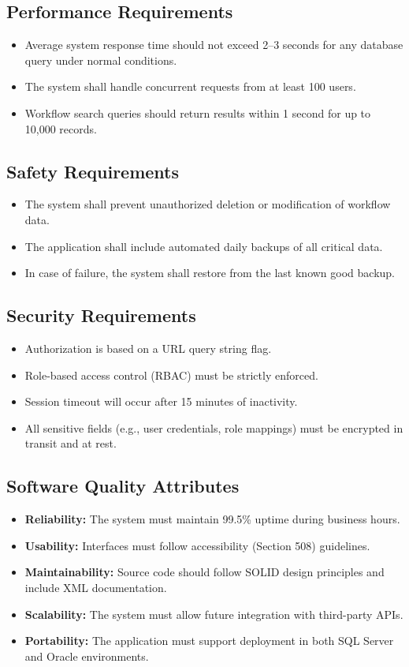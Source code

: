 \documentclass[12pt]{article}
\begin{document}
\subsection{Performance Requirements}
\begin{itemize}
    \item Average system response time should not exceed 2--3 seconds for any database query
    under normal conditions.
    \item The system shall handle concurrent requests from at least 100 users.
    \item Workflow search queries should return results within 1 second for up to 10,000
    records.
\end{itemize}

\subsection{Safety Requirements}
\begin{itemize}
    \item The system shall prevent unauthorized deletion or modification of workflow data.
    \item The application shall include automated daily backups of all critical data.
    \item In case of failure, the system shall restore from the last known good backup.
\end{itemize}

\subsection{Security Requirements}
\begin{itemize}
    \item Authorization is based on a URL query string flag.
    \item Role-based access control (RBAC) must be strictly enforced.
    \item Session timeout will occur after 15 minutes of inactivity.
    \item All sensitive fields (e.g., user credentials, role mappings) must be encrypted in
    transit and at rest.
\end{itemize}

\subsection{Software Quality Attributes}
\begin{itemize}
    \item \textbf{Reliability:} The system must maintain 99.5\% uptime during business hours.
    \item \textbf{Usability:} Interfaces must follow accessibility (Section 508) guidelines.
    \item \textbf{Maintainability:} Source code should follow SOLID design principles and
    include XML documentation.
    \item \textbf{Scalability:} The system must allow future integration with third-party APIs.
    \item \textbf{Portability:} The application must support deployment in both SQL Server and
    Oracle environments.
\end{itemize}
\end{document}
